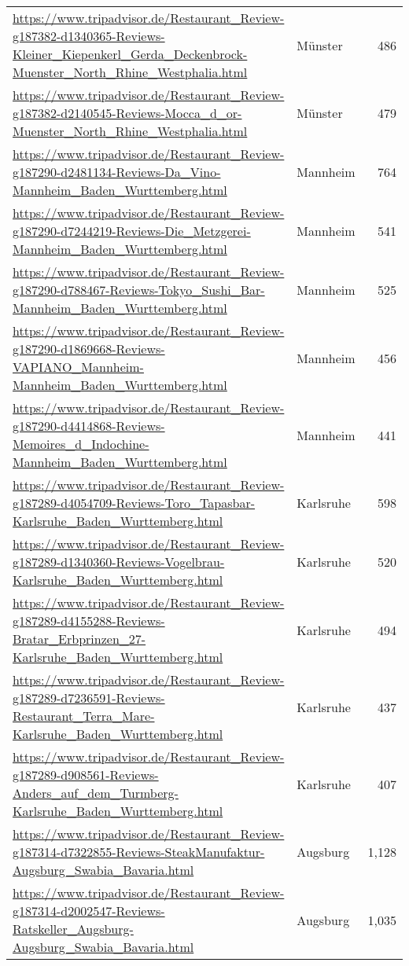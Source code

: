 \begin{table}[H]
{\begin{tabular}{llr}
\url{https://www.tripadvisor.de/Restaurant\_Review-g187382-d1340365-Reviews-Kleiner\_Kiepenkerl\_Gerda\_Deckenbrock-Muenster\_North\_Rhine\_Westphalia.html} & Münster & 486 \\ 
\url{https://www.tripadvisor.de/Restaurant\_Review-g187382-d2140545-Reviews-Mocca\_d\_or-Muenster\_North\_Rhine\_Westphalia.html} & Münster & 479 \\ 
\url{https://www.tripadvisor.de/Restaurant\_Review-g187290-d2481134-Reviews-Da\_Vino-Mannheim\_Baden\_Wurttemberg.html} & Mannheim & 764 \\ 
\url{https://www.tripadvisor.de/Restaurant\_Review-g187290-d7244219-Reviews-Die\_Metzgerei-Mannheim\_Baden\_Wurttemberg.html} & Mannheim & 541 \\ 
\url{https://www.tripadvisor.de/Restaurant\_Review-g187290-d788467-Reviews-Tokyo\_Sushi\_Bar-Mannheim\_Baden\_Wurttemberg.html} & Mannheim & 525 \\ 
\url{https://www.tripadvisor.de/Restaurant\_Review-g187290-d1869668-Reviews-VAPIANO\_Mannheim-Mannheim\_Baden\_Wurttemberg.html} & Mannheim & 456 \\ 
\url{https://www.tripadvisor.de/Restaurant\_Review-g187290-d4414868-Reviews-Memoires\_d\_Indochine-Mannheim\_Baden\_Wurttemberg.html} & Mannheim & 441 \\ 
\url{https://www.tripadvisor.de/Restaurant\_Review-g187289-d4054709-Reviews-Toro\_Tapasbar-Karlsruhe\_Baden\_Wurttemberg.html} & Karlsruhe & 598 \\ 
\url{https://www.tripadvisor.de/Restaurant\_Review-g187289-d1340360-Reviews-Vogelbrau-Karlsruhe\_Baden\_Wurttemberg.html} & Karlsruhe & 520 \\ 
\url{https://www.tripadvisor.de/Restaurant\_Review-g187289-d4155288-Reviews-Bratar\_Erbprinzen\_27-Karlsruhe\_Baden\_Wurttemberg.html} & Karlsruhe & 494 \\ 
\url{https://www.tripadvisor.de/Restaurant\_Review-g187289-d7236591-Reviews-Restaurant\_Terra\_Mare-Karlsruhe\_Baden\_Wurttemberg.html} & Karlsruhe & 437 \\ 
\url{https://www.tripadvisor.de/Restaurant\_Review-g187289-d908561-Reviews-Anders\_auf\_dem\_Turmberg-Karlsruhe\_Baden\_Wurttemberg.html} & Karlsruhe & 407 \\ 
\url{https://www.tripadvisor.de/Restaurant\_Review-g187314-d7322855-Reviews-SteakManufaktur-Augsburg\_Swabia\_Bavaria.html} & Augsburg & 1,128 \\ 
\url{https://www.tripadvisor.de/Restaurant\_Review-g187314-d2002547-Reviews-Ratskeller\_Augsburg-Augsburg\_Swabia\_Bavaria.html} & Augsburg & 1,035 \\ 

\end{tabular}}
\end{table}
